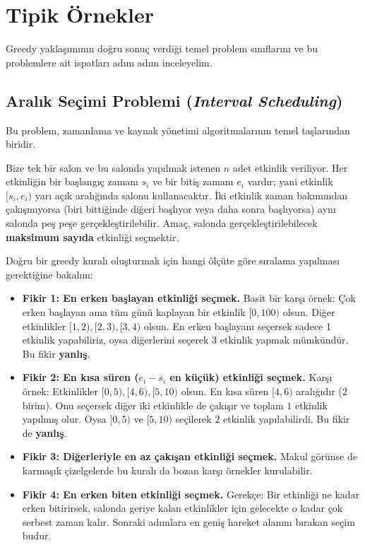 \section{Tipik Örnekler}

Greedy yaklaşımının doğru sonuç verdiği temel problem sınıflarını ve bu problemlere ait ispatları adım adım inceleyelim.

\subsection{Aralık Seçimi Problemi (\textit{Interval Scheduling})}

Bu problem, zamanlama ve kaynak yönetimi algoritmalarının temel taşlarından biridir.

\begin{definition}
Bize tek bir salon ve bu salonda yapılmak istenen $n$ adet etkinlik veriliyor. Her etkinliğin bir başlangıç zamanı $s_i$ ve bir bitiş zamanı $e_i$ vardır; yani etkinlik $[s_i, e_i)$ yarı açık aralığında salonu kullanacaktır. İki etkinlik zaman bakımından çakışmıyorsa (biri bittiğinde diğeri başlıyor veya daha sonra başlıyorsa) aynı salonda peş peşe gerçekleştirilebilir. Amaç, salonda gerçekleştirilebilecek \textbf{maksimum sayıda} etkinliği seçmektir.
\end{definition}

Doğru bir greedy kuralı oluşturmak için hangi ölçüte göre sıralama yapılması gerektiğine bakalım:
\begin{itemize}
    \item \textbf{Fikir 1: En erken başlayan etkinliği seçmek.}
    Basit bir karşı örnek: Çok erken başlayan ama tüm günü kaplayan bir etkinlik $[0, 100)$ olsun. Diğer etkinlikler $[1, 2), [2, 3), [3, 4)$ olsun. En erken başlayanı seçersek sadece 1 etkinlik yapabiliriz, oysa diğerlerini seçerek 3 etkinlik yapmak mümkündür. Bu fikir \textbf{yanlış}.
    \item \textbf{Fikir 2: En kısa süren ($e_i - s_i$ en küçük) etkinliği seçmek.}
    Karşı örnek: Etkinlikler $[0, 5), [4, 6), [5, 10)$ olsun. En kısa süren $[4, 6)$ aralığıdır ($2$ birim). Onu seçersek diğer iki etkinlikle de çakışır ve toplam $1$ etkinlik yapılmış olur. Oysa $[0, 5)$ ve $[5, 10)$ seçilerek $2$ etkinlik yapılabilirdi. Bu fikir de \textbf{yanlış}.
    \item \textbf{Fikir 3: Diğerleriyle en az çakışan etkinliği seçmek.}
    Makul görünse de karmaşık çizelgelerde bu kuralı da bozan karşı örnekler kurulabilir.
    \item \textbf{Fikir 4: En erken biten etkinliği seçmek.}
    Gerekçe: Bir etkinliği ne kadar erken bitirirsek, salonda geriye kalan etkinlikler için gelecekte o kadar çok serbest zaman kalır. Sonraki adımlara en geniş hareket alanını bırakan seçim budur.
\end{itemize}

